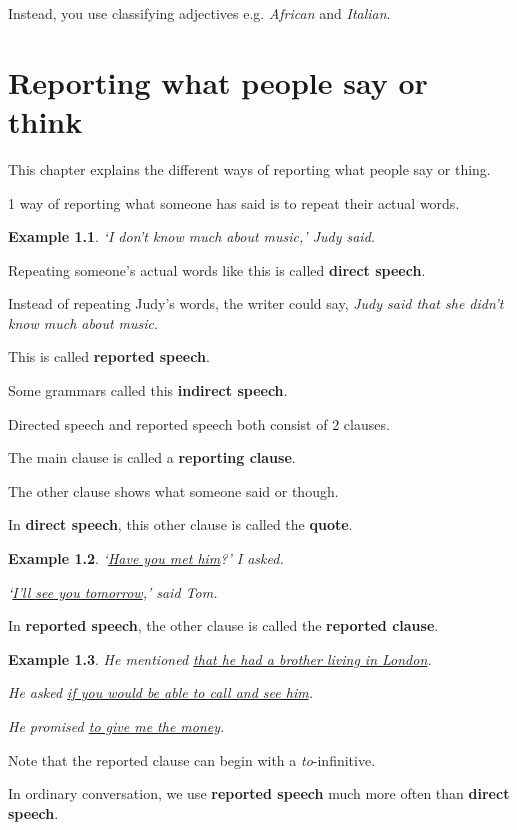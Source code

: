 \documentclass[oneside]{book}
\numberwithin{equation}{section}
\newtheorem{example}{Example}[section]
\begin{document}
Instead, you use classifying adjectives e.g. \textit{African} and \textit{Italian}.


\chapter{Reporting what people say or think}

\noindent{} This chapter explains the different ways of reporting what people say or thing.

%
\noindent{} 1 way of reporting what someone has said is to repeat their actual words.
\begin{example}
    `I don't know much about music,' Judy said.
\end{example}
Repeating someone's actual words like this is called \textbf{direct speech}.

%
Instead of repeating Judy's words, the writer could say, \textit{Judy said that she didn't know much about music}.

This is called \textbf{reported speech}.

Some grammars called this \textbf{indirect speech}.

%
Directed speech and reported speech both consist of 2 clauses.

The main clause is called a \textbf{reporting clause}.

The other clause shows what someone said or though.

%
In \textbf{direct speech}, this other clause is called the \textbf{quote}.
\begin{example}
    `\underline{Have you met him}?' I asked.
    
    `\underline{I'll see you tomorrow},' said Tom.
\end{example}
In \textbf{reported speech}, the other clause is called the \textbf{reported clause}.
\begin{example}
    He mentioned \underline{that he had a brother living in London}.
    
    He asked \underline{if you would be able to call and see him}.
    
    He promised \underline{to give me the money}.
\end{example}
Note that the reported clause can begin with a \textit{to}-infinitive.

%
\noindent{} In ordinary conversation, we use \textbf{reported speech} much more often than \textbf{direct speech}.
\end{document}
